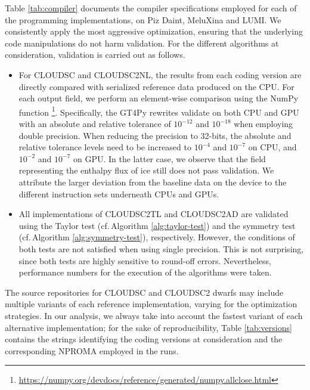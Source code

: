 \documentclass[main.tex]{subfiles}
\begin{document}
        \noindent Table \ref{tab:compiler} documents the compiler specifications employed for each of the programming implementations, on Piz Daint, MeluXina and LUMI. We consistently apply the most aggressive optimization, ensuring that the underlying code manipulations do not harm validation. For the different algorithms at consideration, validation is carried out as follows.
        \begin{itemize}
            \item For CLOUDSC and CLOUDSC2NL, the results from each coding version are directly compared with serialized reference data produced on the CPU. For each output field, we perform an element-wise comparison using the NumPy function \footnote{\url{https://numpy.org/devdocs/reference/generated/numpy.allclose.html}}. Specifically, the GT4Py rewrites validate on both CPU and GPU with an absolute and relative tolerance of $10^{-12}$ and $10^{-18}$ when employing double precision. When reducing the precision to 32-bits, the absolute and relative tolerance levels need to be increased to $10^{-4}$ and $10^{-7}$ on CPU, and $10^{-2}$ and $10^{-7}$ on GPU. In the latter case, we observe that the field representing the enthalpy flux of ice still does not pass validation. We attribute the larger deviation from the baseline data on the device to the different instruction sets underneath CPUs and GPUs.
            \item All implementations of CLOUDSC2TL and CLOUDSC2AD are validated using the Taylor test (cf.\,Algorithm \ref{alg:taylor-test}) and the symmetry test (cf.\,Algorithm \ref{alg:symmetry-test}), respectively. However, the conditions of both tests are not satisfied when using single precision. This is not surprising, since both tests are highly sensitive to round-off errors. Nevertheless, performance numbers for the execution of the algorithms were taken.
        \end{itemize}
        \noindent The source repositories for CLOUDSC and CLOUDSC2 dwarfs may include multiple variants of each reference implementation, varying for the optimization strategies. In our analysis, we always take into account the fastest variant of each alternative implementation; for the sake of reproducibility, Table \ref{tab:versions} contains the strings identifying the coding versions at consideration and the corresponding NPROMA employed in the runs.
\end{document}
